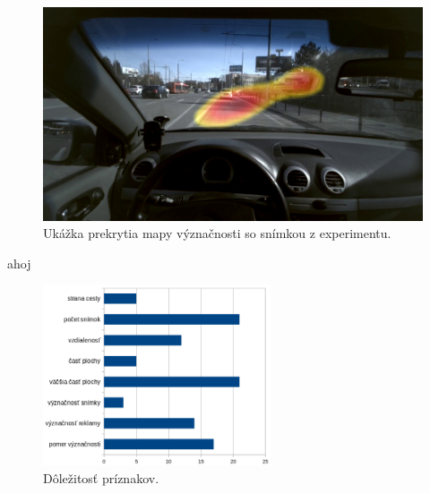 \begin{figure}[H]
    \centering
    \includegraphics[width=1\textwidth]{images/05/sal_frame.jpg}
    \caption{Ukážka prekrytia mapy význačnosti so snímkou z experimentu.}
    \label{img:salmap}
\end{figure}

ahoj

\begin{figure}[ht]
    \centering
    \includegraphics[width=0.6\textwidth]{images/05/chart2.png}
    \caption{Dôležitosť príznakov.}
    \label{img:road}
\end{figure}

%
%
%




